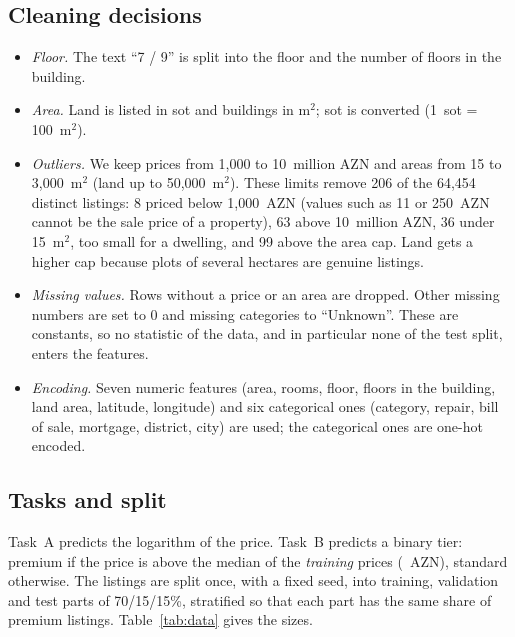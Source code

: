 \documentclass[10pt,twocolumn,a4paper]{article}
\newcommand{\gentable}[1]{\resizebox{\ifdim\width>\linewidth\linewidth\else\width\fi}{!}{}}
\begin{document}
\subsection{Cleaning decisions}
\begin{itemize}
  \item \textit{Floor.} The text ``7 / 9'' is split into the floor and
        the number of floors in the building.
  \item \textit{Area.} Land is listed in sot and buildings in m$^2$; sot
        is converted (1~sot = 100~m$^2$).
  \item \textit{Outliers.} We keep prices from 1{,}000 to 10~million AZN
        and areas from 15 to 3{,}000~m$^2$ (land up to 50{,}000~m$^2$).
        These limits remove 206 of the 64{,}454 distinct listings: 8
        priced below 1{,}000~AZN (values such as 11 or 250~AZN cannot be
        the sale price of a property), 63 above 10~million AZN, 36 under
        15~m$^2$, too small for a dwelling, and 99 above the area cap.
        Land gets a higher cap because plots of several hectares are
        genuine listings.
  \item \textit{Missing values.} Rows without a price or an area are
        dropped. Other missing numbers are set to 0 and missing categories
        to ``Unknown''. These are constants, so no statistic of the data,
        and in particular none of the test split, enters the features.
  \item \textit{Encoding.} Seven numeric features (area, rooms, floor,
        floors in the building, land area, latitude, longitude) and six
        categorical ones (category, repair, bill of sale, mortgage,
        district, city) are used; the categorical ones are one-hot encoded.
\end{itemize}

\subsection{Tasks and split}
Task~A predicts the logarithm of the price. Task~B predicts a binary tier:
premium if the price is above the median of the \emph{training} prices
(\TierThreshold~AZN), standard otherwise. The listings are split once,
with a fixed seed, into training, validation and test parts of
70/15/15\%, stratified so that each part has the same share of premium
listings. Table~\ref{tab:data} gives the sizes.

\begin{table}[t]
  \centering
  \caption{Dataset after cleaning.}
  \label{tab:data}
  \gentable{data_summary}
\end{table}
\end{document}
